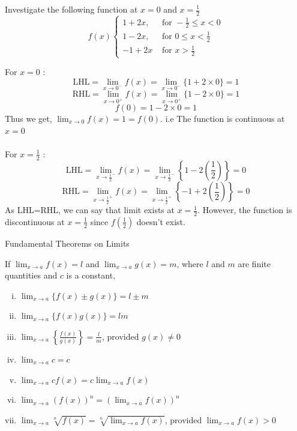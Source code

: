 \documentclass[12pt]{article}
\begin{document}
\begin{example}{
        Investigate the following function at $x=0$ and $x=\frac{1}{2}$ \\
        \begin{equation*}
            f(x)
            \begin{cases}
                1+2x, &\text{ for }-\frac{1}{2}\le x<0 \\
                1-2x, &\text{ for }0\le x<\frac{1}{2} \\
                -1+2x &\text{ for }x>\frac{1}{2}
            \end{cases}
        \end{equation*}
    }

        For $x=0$ :
        \[ \text{LHL} = \lim_{x \to 0^-} f(x) = \lim_{x \to 0^-} \{ 1 + 2 \times 0 \} = 1 \]
        \[ \text{RHL} = \lim_{x \to 0^+} f(x) = \lim_{x \to 0^+} \{ 1 - 2 \times 0 \} = 1 \]
        \[ f(0) = 1-2\times0 = 1 \]
        Thus we get, $\lim_{x \to 0} f(x) = 1 = f(0)$. i.e The function is continuous at $x=0$ \\~\\

        For $x=\frac{1}{2}$ :
        \[ \text{LHL} = \lim_{x \to \frac{1}{2}^-} f(x) = \lim_{x \to \frac{1}{2}^-} \left\{ 1 - 2\left( \frac{1}{2} \right)  \right\} = 0 \]
        \[ \text{RHL} = \lim_{x \to \frac{1}{2}^+} f(x) = \lim_{x \to \frac{1}{2}^+} \left\{ -1 + 2\left( \frac{1}{2} \right)  \right\} = 0 \]
        As LHL=RHL, we can say that limit exists at $x=\frac{1}{2}$. However, the function is discontinuous at $x=\frac{1}{2}$ since $f\left( \frac{1}{2} \right) $ doesn't exist.
\end{example}

\begin{theorem}{Fundamental Theorems on Limits}
    
    If $\lim_{x \to a} f(x) = l$ and $\lim_{x \to a} g(x) = m$, where $l$ and $m$ are finite quantities and $c$ is a constant,
    \begin{enumerate}[(i)]
        \item $ \lim_{x \to a} \{ f(x) \pm g(x) \} = l \pm m $
        \item $ \lim_{x \to a} \{ f(x)g(x) \} = lm $ 
        \item $ \lim_{x \to a} \left\{ \frac{f(x)}{g(x)} \right\} = \frac{l}{m} $, provided $g(x)\neq 0$
        \item $ \lim_{x \to a} c = c $
        \item $ \lim_{x \to a} c f(x) = c \lim_{x \to a} f(x) $
        \item $ \lim_{x \to a} \left( f(x) \right)^n = \left( \lim_{x \to a} f(x) \right)^n $
        \item $ \lim_{x \to a} \sqrt[n]{f(x)} = \sqrt[n]{\lim_{x \to a} f(x)} $, provided $\lim_{x \to a} f(x) > 0$
    \end{enumerate}
\end{theorem}
\end{document}
